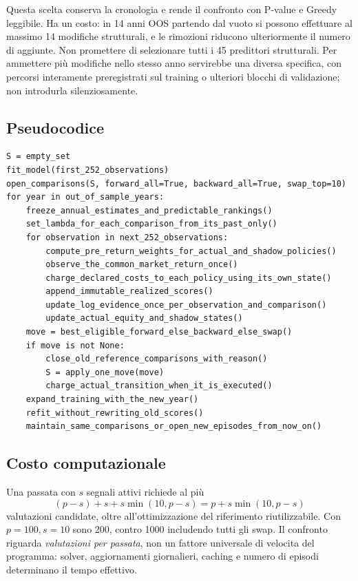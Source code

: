 \documentclass[11pt,a4paper]{article}
\theoremstyle{definition}\newtheorem{definition}[theorem]{Definizione}
\theoremstyle{remark}\newtheorem{remark}[theorem]{Osservazione}
\begin{document}
Questa scelta conserva la cronologia e rende il confronto con P-value e Greedy leggibile. Ha un costo: in 14 anni OOS partendo dal vuoto si possono effettuare al massimo 14 modifiche strutturali, e le rimozioni riducono ulteriormente il numero di aggiunte. Non promettere di selezionare tutti i 45 predittori strutturali. Per ammettere più modifiche nello stesso anno servirebbe una diversa specifica, con percorsi interamente preregistrati sul training o ulteriori blocchi di validazione; non introdurla silenziosamente.

\subsection{Pseudocodice}
\begin{lstlisting}
S = empty_set
fit_model(first_252_observations)
open_comparisons(S, forward_all=True, backward_all=True, swap_top=10)
for year in out_of_sample_years:
    freeze_annual_estimates_and_predictable_rankings()
    set_lambda_for_each_comparison_from_its_past_only()
    for observation in next_252_observations:
        compute_pre_return_weights_for_actual_and_shadow_policies()
        observe_the_common_market_return_once()
        charge_declared_costs_to_each_policy_using_its_own_state()
        append_immutable_realized_scores()
        update_log_evidence_once_per_observation_and_comparison()
        update_actual_equity_and_shadow_states()
    move = best_eligible_forward_else_backward_else_swap()
    if move is not None:
        close_old_reference_comparisons_with_reason()
        S = apply_one_move(move)
        charge_actual_transition_when_it_is_executed()
    expand_training_with_the_new_year()
    refit_without_rewriting_old_scores()
    maintain_same_comparisons_or_open_new_episodes_from_now_on()
\end{lstlisting}

\subsection{Costo computazionale}
Una passata con $s$ segnali attivi richiede al più
\begin{equation}
 (p-s)+s+s\min(10,p-s)=p+s\min(10,p-s)
\end{equation}
valutazioni candidate, oltre all'ottimizzazione del riferimento riutilizzabile. Con $p=100,s=10$ sono 200, contro 1000 includendo tutti gli swap. Il confronto riguarda \emph{valutazioni per passata}, non un fattore universale di velocita del programma: solver, aggiornamenti giornalieri, caching e numero di episodi determinano il tempo effettivo.
\end{document}
